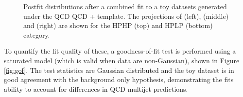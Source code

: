 \begin{figure}[h!]
\caption{Postfit distributions after a combined fit to a toy datasets generated under the QCD QCD \MADGRAPH{}+ template. The projections of \MJO (left), \MJT (middle) and \MVV (right) are shown for the HPHP (top) and HPLP (bottom) category.}
\label{fig:postfitMadgraph}
\end{figure}
To quantify the fit quality of these, a goodness-of-fit test is performed using a saturated model (which is valid when data are non-Gaussian), shown in Figure \ref{fig:gof}. The test statistics are Gaussian distributed and the toy dataset is in good agreement with the background only hypothesis, demonstrating the fits ability to account for differences in QCD multijet predictions.
\begin{figure}[h!]
\centering
{}

\end{figure}

